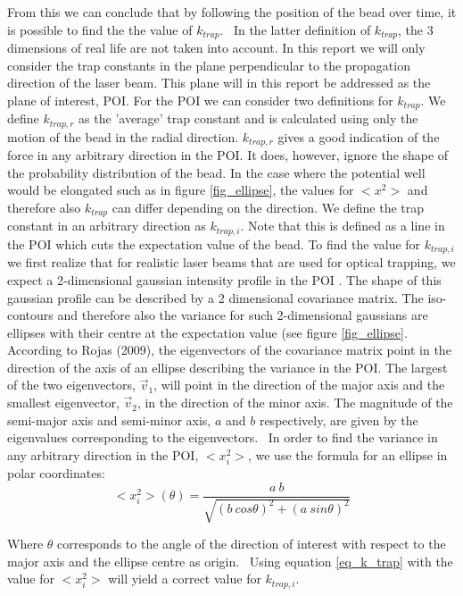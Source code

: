 From this we can conclude that by following the position of the bead over time, it is possible to find the the value of $k_{trap}$. \
In the latter definition of $k_{trap}$, the 3 dimensions of real life are not taken into account. In this report we will only consider the trap constants in the plane perpendicular to the propagation direction of the laser beam. This plane will in this report be addressed as the plane of interest, POI. For the POI we can consider two definitions for $k_{trap}$. We define $k_{trap,r}$ as the 'average' trap constant and is calculated using only the motion of the bead in the radial direction. $k_{trap,r}$ gives a good indication of the force in any arbitrary direction in the POI. It does, however, ignore the shape of the probability distribution of the bead. In the case where the potential well would be elongated such as in figure \ref{fig_ellipse}, the values for $ <x^2> $ and therefore also $k_{trap}$ can differ depending on the direction. We define the trap constant in an arbitrary direction as $k_{trap,i}$. Note that this is defined as a line in the POI which cuts the expectation value of the bead. To find the value for $k_{trap,i}$ we first realize that for realistic laser beams that are used for optical trapping, we expect a 2-dimensional gaussian intensity profile in the POI \cite{sheavitz}. The shape of this gaussian profile can be described by a 2 dimensional covariance matrix. The iso-contours and therefore also the variance for such 2-dimensional gaussians are ellipses with their centre at the expectation value \cite{chuong} (see figure \ref{fig_ellipse}. According to Rojas (2009), the eigenvectors of the covariance matrix point in the direction of the axis of an ellipse describing the variance in the POI. The largest of the two eigenvectors, $\vec{v}_1$, will point in the direction of the major axis and the smallest eigenvector, $\vec{v}_2$, in the direction of the minor axis. The magnitude of the semi-major axis and semi-minor axis, $a$ and $b$ respectively, are given by the eigenvalues corresponding to the eigenvectors.\cite{rojas} \
In order to find the variance in any arbitrary direction in the POI,  $<x_i^2>$, we use the formula for an ellipse in polar coordinates:
\label{alternate_method}
\begin{equation}
	<x_i^2>( \theta ) = \frac{a \: b}{\sqrt{( b \: cos\theta)^2 + (a \: sin\theta )^2}}
\end{equation}

Where $\theta$ corresponds to the angle of the direction of interest with respect to the major axis and the ellipse centre as origin. \
Using equation \ref{eq_k_trap} with the value for $ <x_i^2>$ will yield a correct value for $k_{trap,i}$.

